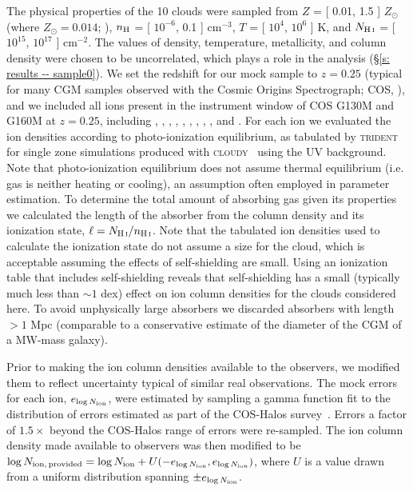 \documentclass[fleqn,usenatbib]{mnras}
\begin{document}
The physical properties of the 10 clouds were sampled from $Z$ = [ 0.01, 1.5 ] $Z_\odot$ (where $Z_\odot = 0.014$; \citealt{asplund2009Chemical}), $n_{\rm H}$ = [ $10^{-6}$, 0.1 ] cm$^{-3}$, $T$ = [ $10^4$, $10^6$ ] K, and $N_{\ion{H}{I}}$ = [ $10^{15}$, $10^{17}$ ] cm$^{-2}$.
The values of density, temperature, metallicity, and  column density were chosen to be uncorrelated, which plays a role in the analysis (\S\ref{s: results -- sample0}).
We set the redshift for our mock sample to $z=0.25$ (typical for many CGM samples observed with the Cosmic Origins Spectrograph; COS, \citealt{green2012COSMIC}), and we included all ions present in the instrument window of COS G130M and G160M at $z=0.25$, including , , , , , , ,  , , and .
For each ion we evaluated the ion densities according to photo-ionization equilibrium, as tabulated by \textsc{trident} for single zone simulations produced with \textsc{cloudy}~\citep{ferland20132013} using the \cite{haardt2012RADIATIVE} UV background.
Note that photo-ionization equilibrium does not assume thermal equilibrium (i.e. gas is neither heating or cooling),
an assumption often employed in parameter estimation.
To determine the total amount of absorbing gas given its properties we calculated the length of the absorber from the  column density and its ionization state, $\ell = N_{\ion{H}{I}} / n_{\ion{H}{I}}$.
Note that the tabulated ion densities used to calculate the ionization state do not assume a size for the cloud, which is acceptable assuming the effects of self-shielding are small.
Using an ionization table that includes self-shielding reveals that self-shielding has a small (typically much less than $\sim 1$ dex) effect on ion column densities for the clouds considered here.
To avoid unphysically large absorbers we discarded absorbers with length $> 1$ Mpc (comparable to a conservative estimate of the diameter of the CGM of a MW-mass galaxy).

Prior to making the ion column densities available to the observers, we modified them to reflect uncertainty typical of similar real observations.
The mock errors for each ion, $e_{\log N_{\rm ion}}$, were estimated by sampling a gamma function fit to the distribution of errors estimated as part of the COS-Halos survey~\citep{werk2013COSHALOS}.
Errors a factor of $1.5\times$ beyond the COS-Halos range of errors were re-sampled.
The ion column density made available to observers was then modified to be $\log N_{\rm ion,\,provided} = \log N_{\rm ion} + U(-e_{\log N_{\rm ion}}, e_{\log N_{\rm ion}} )$, where $U$ is a value drawn from a uniform distribution spanning $\pm e_{\log N_{\rm ion}}$.
\end{document}
